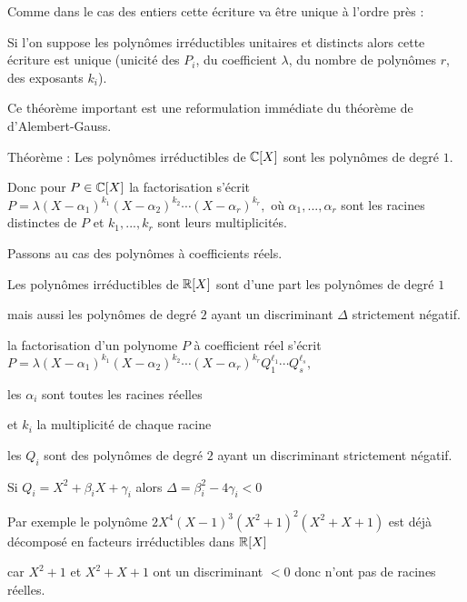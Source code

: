 \change


Comme dans le cas des entiers cette écriture va être unique à l'ordre près :

Si l'on suppose les polynômes irréductibles unitaires et distincts
alors cette écriture est unique 
(unicité des $P_i$, du coefficient $\lambda$,
du nombre de polynômes $r$,
 des exposants $k_i$).




\diapo


Ce théorème important est une reformulation immédiate du théorème de d'Alembert-Gauss.  

Théorème : Les polynômes irréductibles de $\mathbb{C}[X]$ sont les polynômes de degré $1$. 

\change

Donc pour $P\in\mathbb{C}[X]$ la factorisation s'écrit 
$P=\lambda (X-\alpha_1)^{k_1}(X- \alpha_2)^{k_2}\cdots(X- \alpha_r)^{k_r},$ 
où $\alpha_1,...,\alpha_r$ sont les racines distinctes de $P$ et
$k_1,...,k_r$ sont leurs multiplicités. 


\diapo

Passons au cas des polynômes à coefficients réels.

Les polynômes irréductibles de $\mathbb{R}[X]$
sont d'une part les polynômes de degré $1$ 

mais aussi les polynômes de degré $2$ ayant
un discriminant $\Delta$ strictement négatif.

\change

la factorisation d'un polynome $P$ à coefficient réel s'écrit
$P=\lambda(X-\alpha_1)^{k_1}(X-\alpha_2)^{k_2}\cdots(X-\alpha_r)^{k_r}
Q_1^{\ell_1}\cdots Q_s^{\ell_s},$

\change

les $\alpha_i$ sont toutes les racines réelles 

et $k_i$ la multiplicité de chaque racine

\change
les $Q_i$ sont des polynômes de degré $2$
ayant un discriminant strictement négatif.

Si $Q_i=X^2+\beta_iX+\gamma_i$ alors $\Delta = \beta_i^2-4\gamma_i<0$


\change

Par exemple le polynôme $2X^4(X-1)^3(X^2+1)^2(X^2+X+1)$ 
est déjà décomposé en facteurs irréductibles dans $\mathbb{R}[X]$

car $X^2+1$ et $X^2+X+1$ ont un discriminant $<0$ donc n'ont pas de racines réelles.

